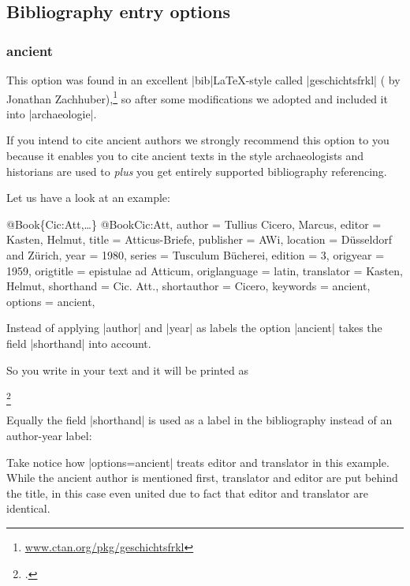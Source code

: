 \documentclass[a4paper,
10pt,
greek,
french,
spanish,
italian,
ngerman,
english
]{ltxdoc}
\begin{document}
\subsection{Bibliography entry options}\label{options-bibentry}
\subsubsection{ancient}\label{ancient}
This option was found in an excellent |bib|\LaTeX-style called  |geschichtsfrkl| ( by Jonathan Zachhuber),\footnote{\href{https://www.ctan.org/pkg/geschichtsfrkl}{www.ctan.org/pkg/geschichtsfrkl}} 
so after some modifications we adopted and included it into |archaeologie|.
 
If you intend to cite ancient authors we strongly recommend this option to you 
because it enables you to cite ancient texts in the style archaeologists and 
historians are used to \emph{plus} you get entirely supported bibliography referencing.

Let us have a look at an example:
\begin{bibexample}[label=Cic:Att]{{@}Book\{Cic:Att,…\}}
@Book{Cic:Att,
  author       = {Tullius Cicero, Marcus},
  editor       = {Kasten, Helmut},
  title        = {Atticus-Briefe},
  publisher    = AWi,   %
  location     = {Düsseldorf and Zürich},
  year         = {1980},
  series       = {Tusculum Bücherei},
  edition      = {3},
  origyear     = {1959},
  origtitle    = {epistulae ad Atticum},
  origlanguage = {latin},
  translator   = {Kasten, Helmut},
  shorthand    = {Cic. Att.},
  shortauthor  = {Cicero},
  keywords     = {ancient},
  options      = {ancient}, %
}
\end{bibexample}

Instead of applying |author| and |year| as labels the option |ancient| takes the field |shorthand| into account.

So you write in your text and it will be printed as

\begin{example}
\footnote{\cite[1, 3,3]{Cic:Att}.}
\end{example} 

Equally the field |shorthand| is used as a label in the bibliography instead of an author-year label:

Take notice how |options={ancient}| treats editor and translator in this example. 
While the ancient author is mentioned first, translator and editor are put behind the title, 
in this case even united due to fact that editor and translator are identical.
\end{document}
